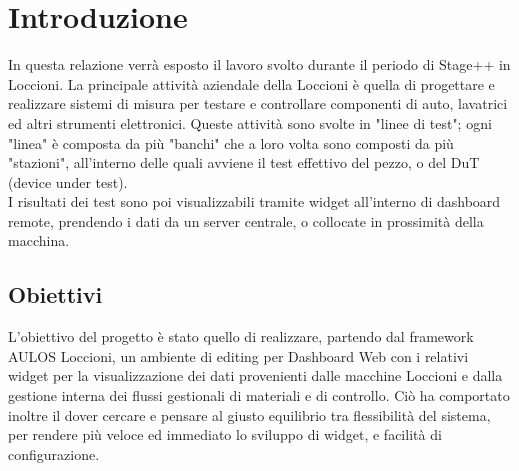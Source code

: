 \chapter{Introduzione}
\label{chap:intro}

In questa relazione verrà esposto il lavoro svolto durante il periodo di Stage++ in Loccioni.
La principale attività aziendale della Loccioni è quella di progettare e realizzare sistemi di misura per 
testare e controllare componenti di auto, lavatrici ed altri strumenti elettronici.
Queste attività sono svolte in "linee di test"; ogni "linea" è composta da più "banchi" che a loro volta sono composti da più "stazioni", all'interno delle quali avviene 
il test effettivo del pezzo, o del DuT (device under test).\\
I risultati dei test sono poi visualizzabili tramite widget all'interno di dashboard remote, prendendo i dati da un server centrale, 
o collocate in prossimità della macchina.


\section{Obiettivi}
L'obiettivo del progetto è stato quello di realizzare, partendo dal framework AULOS Loccioni, un ambiente di editing per
Dashboard Web con i relativi widget per la visualizzazione dei dati provenienti dalle macchine Loccioni e dalla gestione 
interna dei flussi gestionali di materiali e di controllo. Ciò ha comportato inoltre il dover cercare e pensare al giusto equilibrio 
tra flessibilità del sistema, per rendere più veloce ed immediato lo sviluppo di widget, e facilità di configurazione.



